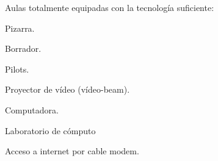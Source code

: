\begin{syllabus}
\begin{didactical-resources}
Aulas totalmente equipadas con la tecnología suficiente:

\begin{inparaenum}[ \bf I:]
\item Pizarra.
\item Borrador.
\item Pilots.
\item Proyector de vídeo (vídeo-beam).
\item Computadora.
\item Laboratorio de cómputo
\item Acceso a internet por cable modem.
\end{inparaenum}

\end{didactical-resources}


\begin{coursebibliography}
\end{coursebibliography}

\end{syllabus}
